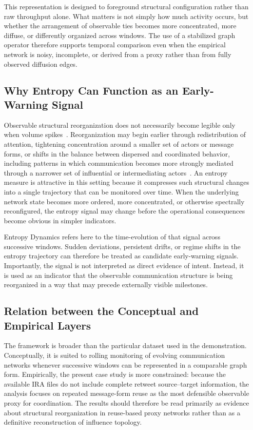 \documentclass[sigconf]{acmart}
\begin{document}
This representation is designed to foreground structural configuration rather than raw throughput alone. What matters is not simply how much activity occurs, but whether the arrangement of observable ties becomes more concentrated, more diffuse, or differently organized across windows. The use of a stabilized graph operator therefore supports temporal comparison even when the empirical network is noisy, incomplete, or derived from a proxy rather than from fully observed diffusion edges.

\subsection{Why Entropy Can Function as an Early-Warning Signal}

Observable structural reorganization does not necessarily become legible only when volume spikes~\cite{GhoshRanu2023}. Reorganization may begin earlier through redistribution of attention, tightening concentration around a smaller set of actors or message forms, or shifts in the balance between dispersed and coordinated behavior, including patterns in which communication becomes more strongly mediated through a narrower set of influential or intermediating actors~\cite{katz1955}. An entropy measure is attractive in this setting because it compresses such structural changes into a single trajectory that can be monitored over time. When the underlying network state becomes more ordered, more concentrated, or otherwise spectrally reconfigured, the entropy signal may change before the operational consequences become obvious in simpler indicators.

Entropy Dynamics refers here to the time-evolution of that signal across successive windows. Sudden deviations, persistent drifts, or regime shifts in the entropy trajectory can therefore be treated as candidate early-warning signals. Importantly, the signal is not interpreted as direct evidence of intent. Instead, it is used as an indicator that the observable communication structure is being reorganized in a way that may precede externally visible milestones.

\subsection{Relation between the Conceptual and Empirical Layers}

The framework is broader than the particular dataset used in the demonstration. Conceptually, it is suited to rolling monitoring of evolving communication networks whenever successive windows can be represented in a comparable graph form. Empirically, the present case study is more constrained: because the available IRA files do not include complete retweet source--target information, the analysis focuses on repeated message-form reuse as the most defensible observable proxy for coordination. The results should therefore be read primarily as evidence about structural reorganization in reuse-based proxy networks rather than as a definitive reconstruction of influence topology.
\end{document}
